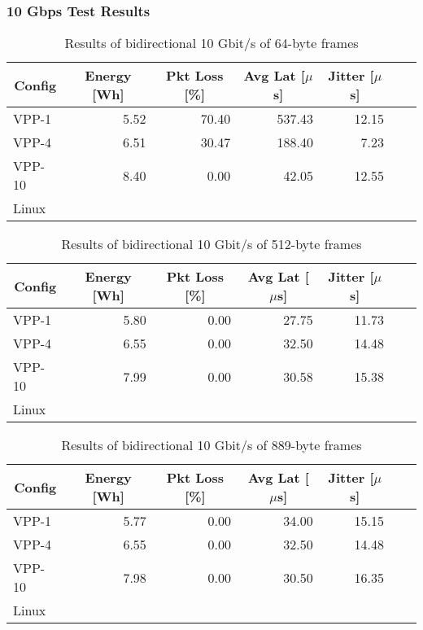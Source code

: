 \subsubsection{10 Gbps Test Results}

\begin{table}[h!]
\centering
\caption{Results of bidirectional 10 Gbit/s of 64-byte frames}
\begin{tabular}{|l|r|r|r|r|r|r|}
\hline
\multicolumn{1}{|c|}{\textbf{Config}} &
\multicolumn{1}{c|}{\textbf{Energy [Wh] }} &
\multicolumn{1}{c|}{\textbf{Pkt Loss [\%]}} &
\multicolumn{1}{c|}{\textbf{Avg Lat [$\mu$s]}} &
\multicolumn{1}{c|}{\textbf{Jitter [$\mu$s]}} \\
\hline 
VPP-1 & 5.52 & 70.40 & 537.43 & 12.15 \\
VPP-4 & 6.51 & 30.47 & 188.40 & 7.23 \\
VPP-10 & 8.40 & 0.00 & 42.05 & 12.55 \\
Linux &  &  &  &  \\
\hline
\end{tabular}
\label{tab:10budp:64B}
\end{table}

\begin{table}[h!]
\centering
\caption{Results of bidirectional 10 Gbit/s of 512-byte frames}
\begin{tabular}{|l|r|r|r|r|r|r|}
\hline
\multicolumn{1}{|c|}{\textbf{Config}} &
\multicolumn{1}{c|}{\textbf{Energy [Wh] }} &
\multicolumn{1}{c|}{\textbf{Pkt Loss [\%]}} &
\multicolumn{1}{c|}{\textbf{Avg Lat [$\mu$s]}} &
\multicolumn{1}{c|}{\textbf{Jitter [$\mu$s]}} \\
\hline 
VPP-1 & 5.80 & 0.00 & 27.75 & 11.73 \\
VPP-4 & 6.55 & 0.00 & 32.50 & 14.48 \\
VPP-10 & 7.99 & 0.00 & 30.58 & 15.38 \\
Linux &  &  &  &  \\
\hline
\end{tabular}
\label{tab:10budp:512B}
\end{table}

\begin{table}[h!]
\centering
\caption{Results of bidirectional 10 Gbit/s of 889-byte frames}
\begin{tabular}{|l|r|r|r|r|r|r|}
\hline
\multicolumn{1}{|c|}{\textbf{Config}} &
\multicolumn{1}{c|}{\textbf{Energy [Wh] }} &
\multicolumn{1}{c|}{\textbf{Pkt Loss [\%]}} &
\multicolumn{1}{c|}{\textbf{Avg Lat [$\mu$s]}} &
\multicolumn{1}{c|}{\textbf{Jitter [$\mu$s]}} \\
\hline 
VPP-1 & 5.77 & 0.00 & 34.00 & 15.15 \\
VPP-4 & 6.55 & 0.00 & 32.50 & 14.48 \\
VPP-10 & 7.98 & 0.00 & 30.50 & 16.35 \\
Linux &  &  &  &  \\
\hline
\end{tabular}
\label{tab:10budp:889B}
\end{table}

